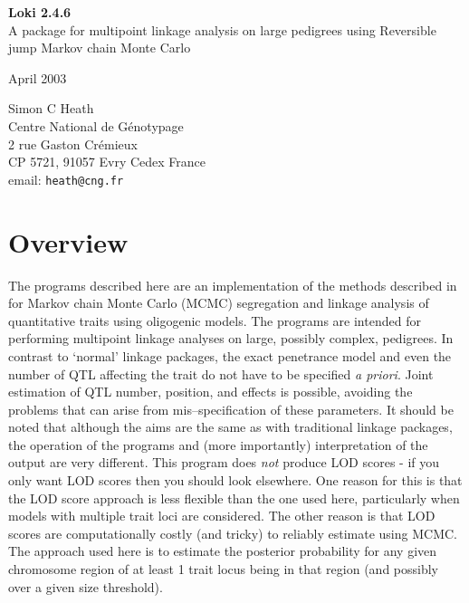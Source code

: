 \documentclass[10pt,a4paper]{article}
\begin{document}
\thispagestyle{empty}
\begin{center}
\begin{Large}
\textbf{Loki 2.4.6}\\[.15in]
A package for multipoint linkage analysis on large pedigrees using
Reversible jump Markov chain Monte Carlo\\[.25in]
\end{Large}
\begin{large}
April 2003\\[4.5in]
\end{large}
\end{center}
Simon C Heath\\ 
Centre National de G\'enotypage\\
2 rue Gaston Cr\'emieux\\
CP 5721, 91057 Evry Cedex
France\\[.1in]
email: \verb+heath@cng.fr+\\
\newpage
\section{Overview}
The programs described here are an implementation of the methods described in
 for Markov chain Monte Carlo (MCMC) segregation and linkage
analysis of quantitative traits using oligogenic models.  The programs are
intended for performing multipoint linkage analyses on large, possibly
complex, pedigrees.  In contrast to `normal' linkage packages, the exact
penetrance model and even the number of QTL affecting the trait do not have
to be specified \textit{a priori}.  Joint estimation of QTL number,
position, and effects is possible, avoiding the problems that can arise from
mis--specification of these parameters.  It should be noted that although
the aims are the same as with traditional linkage packages, the operation of
the programs and (more importantly) interpretation of the output are very
different.  This program does \emph{not} produce LOD scores - if you only
want LOD scores then you should look elsewhere.  One reason for this is that
the LOD score approach is less flexible than the one used here, particularly
when models with multiple trait loci are considered.  The other reason is
that LOD scores are computationally costly (and tricky) to reliably estimate
using MCMC.  The approach used here is to estimate the posterior probability
for any given chromosome region of at least 1 trait locus being in that
region (and possibly over a given size threshold).
\end{document}
